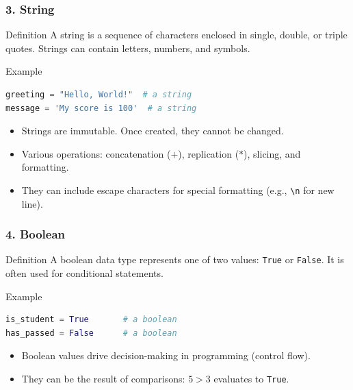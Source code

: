 \documentclass{beamer}
\begin{document}
\begin{frame}[fragile]
    \frametitle{3. String}
    \begin{block}{Definition}
        A string is a sequence of characters enclosed in single, double, or triple quotes. 
        Strings can contain letters, numbers, and symbols.
    \end{block}
    
    \begin{block}{Example}
        \begin{lstlisting}[language=Python]
greeting = "Hello, World!"  # a string
message = 'My score is 100'  # a string
        \end{lstlisting}
    \end{block}
    
    \begin{itemize}
        \item Strings are immutable. Once created, they cannot be changed.
        \item Various operations: concatenation (\(+\)), replication (\(*\)), slicing, and formatting.
        \item They can include escape characters for special formatting (e.g., \texttt{\textbackslash n} for new line).
    \end{itemize}
\end{frame}

\begin{frame}[fragile]
    \frametitle{4. Boolean}
    \begin{block}{Definition}
        A boolean data type represents one of two values: \texttt{True} or \texttt{False}. 
        It is often used for conditional statements.
    \end{block}
    
    \begin{block}{Example}
        \begin{lstlisting}[language=Python]
is_student = True       # a boolean
has_passed = False      # a boolean
        \end{lstlisting}
    \end{block}
    
    \begin{itemize}
        \item Boolean values drive decision-making in programming (control flow).
        \item They can be the result of comparisons: \( 5 > 3 \) evaluates to \texttt{True}.
    \end{itemize}
\end{frame}
\end{document}
